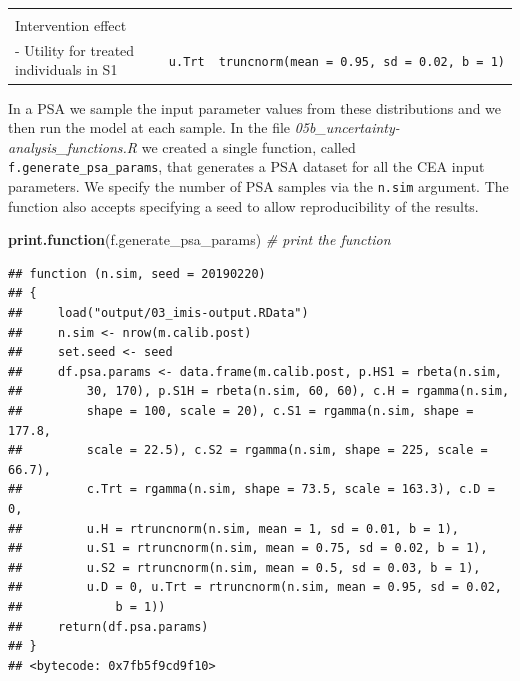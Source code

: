 \documentclass[]{article}
\newenvironment{Shaded}{\begin{snugshade}}{\end{snugshade}}
\newcommand{\KeywordTok}[1]{\textcolor[rgb]{0.13,0.29,0.53}{\textbf{#1}}}
\newcommand{\CommentTok}[1]{\textcolor[rgb]{0.56,0.35,0.01}{\textit{#1}}}
\newcommand{\NormalTok}[1]{#1}
\begin{document}
\begin{longtable}[]{@{}lcc@{}}
\begin{minipage}[t]{0.20\columnwidth}
\end{minipage}\tabularnewline
\begin{minipage}[t]{0.43\columnwidth}\raggedright\strut
Intervention effect\strut
\end{minipage} & \begin{minipage}[t]{0.18\columnwidth}\centering\strut
\strut
\end{minipage} & \begin{minipage}[t]{0.20\columnwidth}\centering\strut
\strut
\end{minipage}\tabularnewline
\begin{minipage}[t]{0.43\columnwidth}\raggedright\strut
- Utility for treated individuals in S1\strut
\end{minipage} & \begin{minipage}[t]{0.18\columnwidth}\centering\strut
\texttt{u.Trt}\strut
\end{minipage} & \begin{minipage}[t]{0.20\columnwidth}\centering\strut
\texttt{truncnorm(mean\ =\ 0.95,\ sd\ =\ 0.02,\ b\ =\ 1)}\strut
\end{minipage}\tabularnewline
\bottomrule
\end{longtable}

In a PSA we sample the input parameter values from these distributions
and we then run the model at each sample. In the file
\emph{05b\_uncertainty-analysis\_functions.R} we created a single
function, called \texttt{f.generate\_psa\_params}, that generates a PSA
dataset for all the CEA input parameters. We specify the number of PSA
samples via the \texttt{n.sim} argument. The function also accepts
specifying a seed to allow reproducibility of the results.

\begin{Shaded}
\begin{Highlighting}[]
\KeywordTok{print.function}\NormalTok{(f.generate_psa_params) }\CommentTok{# print the function }
\end{Highlighting}
\end{Shaded}

\begin{verbatim}
## function (n.sim, seed = 20190220) 
## {
##     load("output/03_imis-output.RData")
##     n.sim <- nrow(m.calib.post)
##     set.seed <- seed
##     df.psa.params <- data.frame(m.calib.post, p.HS1 = rbeta(n.sim, 
##         30, 170), p.S1H = rbeta(n.sim, 60, 60), c.H = rgamma(n.sim, 
##         shape = 100, scale = 20), c.S1 = rgamma(n.sim, shape = 177.8, 
##         scale = 22.5), c.S2 = rgamma(n.sim, shape = 225, scale = 66.7), 
##         c.Trt = rgamma(n.sim, shape = 73.5, scale = 163.3), c.D = 0, 
##         u.H = rtruncnorm(n.sim, mean = 1, sd = 0.01, b = 1), 
##         u.S1 = rtruncnorm(n.sim, mean = 0.75, sd = 0.02, b = 1), 
##         u.S2 = rtruncnorm(n.sim, mean = 0.5, sd = 0.03, b = 1), 
##         u.D = 0, u.Trt = rtruncnorm(n.sim, mean = 0.95, sd = 0.02, 
##             b = 1))
##     return(df.psa.params)
## }
## <bytecode: 0x7fb5f9cd9f10>
\end{verbatim}
\end{document}
